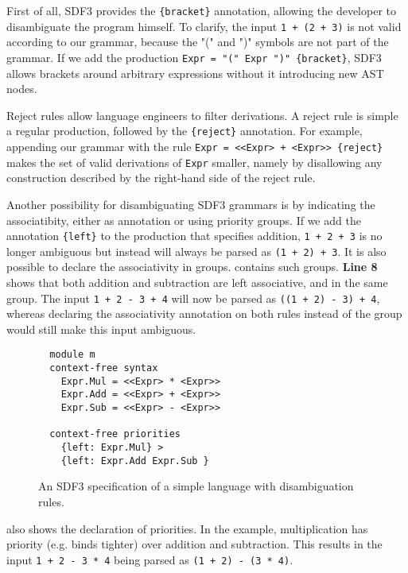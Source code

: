         First of all, SDF3 provides the \texttt{\{bracket\}} annotation, allowing the developer to disambiguate the program himself. To clarify, the input \texttt{1 + (2 + 3)} is not valid according to our grammar, because the "(" and ")" symbols are not part of the grammar. If we add the production \texttt{Expr = "(" Expr ")" \{bracket\}}, SDF3 allows brackets around arbitrary expressions without it introducing new AST nodes.

        Reject rules allow language engineers to filter derivations. A reject rule is simple a regular production, followed by the \texttt{\{reject\}} annotation. For example, appending our grammar with the rule \texttt{Expr = <<Expr> + <Expr>> \{reject\}} makes the set of valid derivations of \texttt{Expr} smaller, namely by disallowing any construction described by the right-hand side of the reject rule.

        Another possibility for disambiguating SDF3 grammars is by indicating the associatibity, either as annotation or using priority groups. If we add the annotation \texttt{\{left\}} to the production that specifies addition, \texttt{1 + 2 + 3} is no longer ambiguous but instead will always be parsed as \texttt{(1 + 2) + 3}. It is also possible to declare the associativity in groups.  contains such groups. \textbf{Line 8} shows that both addition and subtraction are left associative, and in the same group. The input \texttt{1 + 2 - 3 + 4} will now be parsed as \texttt{((1 + 2) - 3) + 4}, whereas declaring the associativity annotation on both rules instead of the group would still make this input ambiguous.

        \begin{figure}
          \begin{verbatim}
  module m
  context-free syntax
    Expr.Mul = <<Expr> * <Expr>>
    Expr.Add = <<Expr> + <Expr>>
    Expr.Sub = <<Expr> - <Expr>>

  context-free priorities
    {left: Expr.Mul} >
    {left: Expr.Add Expr.Sub }
          \end{verbatim}
          \caption{\label{fig:sdf3-syntax-disambiguation}An SDF3 specification of a simple language with disambiguation rules.}
        \end{figure}

         also shows the declaration of priorities. In the example, multiplication has priority (e.g. binds tighter) over addition and subtraction. This results in the input \texttt{1 + 2 - 3 * 4} being parsed as \texttt{(1 + 2) - (3 * 4)}.

